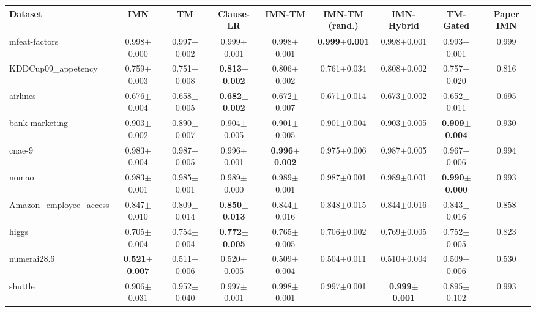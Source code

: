 \begin{tabular}{lcccccccc}
\toprule
Dataset & IMN & TM & Clause-LR & IMN-TM & IMN-TM (rand.) & IMN-Hybrid & TM-Gated & Paper IMN \\
\midrule
mfeat-factors & 0.998{\tiny$\pm$0.000} & 0.997{\tiny$\pm$0.002} & 0.999{\tiny$\pm$0.001} & 0.998{\tiny$\pm$0.001} & \textbf{0.999{\tiny$\pm$0.001}} & 0.998{\tiny$\pm$0.001} & 0.993{\tiny$\pm$0.001} & 0.999 \\
KDDCup09\_appetency & 0.759{\tiny$\pm$0.003} & 0.751{\tiny$\pm$0.008} & \textbf{0.813{\tiny$\pm$0.002}} & 0.806{\tiny$\pm$0.002} & 0.761{\tiny$\pm$0.034} & 0.808{\tiny$\pm$0.002} & 0.757{\tiny$\pm$0.020} & 0.816 \\
airlines & 0.676{\tiny$\pm$0.004} & 0.658{\tiny$\pm$0.005} & \textbf{0.682{\tiny$\pm$0.002}} & 0.672{\tiny$\pm$0.007} & 0.671{\tiny$\pm$0.014} & 0.673{\tiny$\pm$0.002} & 0.652{\tiny$\pm$0.011} & 0.695 \\
bank-marketing & 0.903{\tiny$\pm$0.002} & 0.890{\tiny$\pm$0.007} & 0.904{\tiny$\pm$0.005} & 0.901{\tiny$\pm$0.005} & 0.901{\tiny$\pm$0.004} & 0.903{\tiny$\pm$0.005} & \textbf{0.909{\tiny$\pm$0.004}} & 0.930 \\
cnae-9 & 0.983{\tiny$\pm$0.004} & 0.987{\tiny$\pm$0.005} & 0.996{\tiny$\pm$0.001} & \textbf{0.996{\tiny$\pm$0.002}} & 0.975{\tiny$\pm$0.006} & 0.987{\tiny$\pm$0.005} & 0.967{\tiny$\pm$0.006} & 0.994 \\
nomao & 0.983{\tiny$\pm$0.001} & 0.985{\tiny$\pm$0.001} & 0.989{\tiny$\pm$0.000} & 0.989{\tiny$\pm$0.001} & 0.987{\tiny$\pm$0.001} & 0.989{\tiny$\pm$0.001} & \textbf{0.990{\tiny$\pm$0.000}} & 0.993 \\
Amazon\_employee\_access & 0.847{\tiny$\pm$0.010} & 0.809{\tiny$\pm$0.014} & \textbf{0.850{\tiny$\pm$0.013}} & 0.844{\tiny$\pm$0.016} & 0.848{\tiny$\pm$0.015} & 0.844{\tiny$\pm$0.016} & 0.843{\tiny$\pm$0.016} & 0.858 \\
higgs & 0.705{\tiny$\pm$0.004} & 0.754{\tiny$\pm$0.004} & \textbf{0.772{\tiny$\pm$0.005}} & 0.765{\tiny$\pm$0.005} & 0.706{\tiny$\pm$0.002} & 0.769{\tiny$\pm$0.005} & 0.752{\tiny$\pm$0.005} & 0.823 \\
numerai28.6 & \textbf{0.521{\tiny$\pm$0.007}} & 0.511{\tiny$\pm$0.006} & 0.520{\tiny$\pm$0.005} & 0.509{\tiny$\pm$0.004} & 0.504{\tiny$\pm$0.011} & 0.510{\tiny$\pm$0.004} & 0.509{\tiny$\pm$0.006} & 0.530 \\
shuttle & 0.906{\tiny$\pm$0.031} & 0.952{\tiny$\pm$0.040} & 0.997{\tiny$\pm$0.001} & 0.998{\tiny$\pm$0.001} & 0.997{\tiny$\pm$0.001} & \textbf{0.999{\tiny$\pm$0.001}} & 0.895{\tiny$\pm$0.102} & 0.993 \\

\end{tabular}
